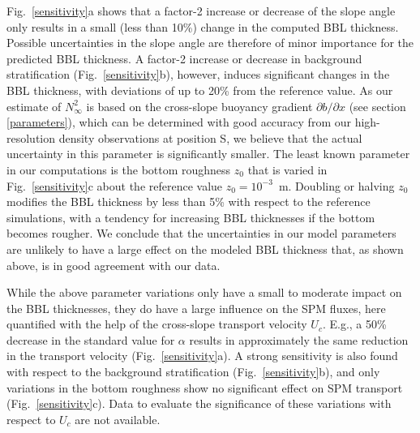 Fig.\ \ref{sensitivity}a shows that a factor-2 increase or decrease of
the slope angle only results in a small (less than 10\%) change in the
computed BBL thickness. Possible uncertainties in the slope angle are
therefore of minor importance for the predicted BBL thickness. A
factor-2 increase or decrease in background stratification
(Fig.\ \ref{sensitivity}b), however, induces significant changes in
the BBL thickness, with deviations of up to 20\% from the reference
value. As our estimate of $N_\infty^2$ is based on the cross-slope
buoyancy gradient $\partial b / \partial x$ (see section
\ref{parameters}), which can be determined with good accuracy from our
high-resolution density observations at position S, we believe that
the actual uncertainty in this parameter is significantly smaller. The
least known parameter in our computations is the bottom roughness
$z_0$ that is varied in Fig.\ \ref{sensitivity}c about the reference
value $z_0 = 10^{-3}$~m. Doubling or halving $z_0$ modifies the BBL
thickness by less than 5\% with respect to the reference simulations,
with a tendency for increasing BBL thicknesses if the bottom becomes
rougher. We conclude that the uncertainties in our model parameters
are unlikely to have a large effect on the modeled BBL thickness that,
as shown above, is in good agreement with our data.


While the above parameter variations only have a small to moderate
impact on the BBL thicknesses, they do have a large influence on the
SPM fluxes, here quantified with the help of the cross-slope transport
velocity $U_c$. E.g., a 50\% decrease in the standard value for
$\alpha$ results in approximately the same reduction in the transport
velocity (Fig.\ \ref{sensitivity}a). A strong sensitivity is also
found with respect to the background stratification
(Fig.\ \ref{sensitivity}b), and only variations in the bottom
roughness show no significant effect on SPM transport
(Fig.\ \ref{sensitivity}c). Data to evaluate the significance of these
variations with respect to $U_c$ are not available.